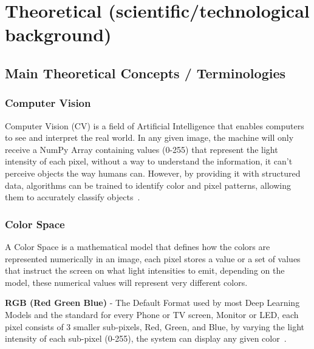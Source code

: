 \section{Theoretical (scientific/technological background)}
\subsection{Main Theoretical Concepts / Terminologies}
\subsubsection{Computer Vision}	
Computer Vision (CV) is a field of Artificial Intelligence that enables computers to see and interpret the real world.
In any given image, the machine will only receive a NumPy Array containing values (0-255) that represent the light intensity of each pixel, without a way to understand the information, it can't perceive objects the way humans can.
However, by providing it with structured data, algorithms can be trained to identify color and pixel patterns, allowing them to accurately classify objects~\cite{sas_computervision, kumari2025hand}.

\subsubsection{Color Space}	
A Color Space is a mathematical model that defines how the colors are represented numerically in an image, each pixel stores a value or a set of values that instruct the screen on what light intensities to emit, depending on the model, these numerical values will represent very different colors.
\newline

\textbf{RGB (Red Green Blue)} - 
The Default Format used by most Deep Learning Models and the standard for every Phone or TV screen, Monitor or LED, each pixel consists of 3 smaller sub-pixels, Red, Green, and Blue, by varying the light intensity of each sub-pixel (0-255), the system can display any given color~\cite{roboflow_colorspaces}.

